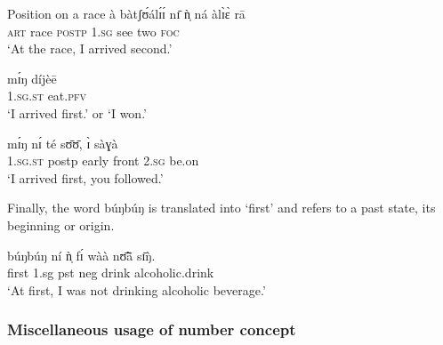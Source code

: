 \begin{exe}
\begin{exe}
\begin{exe}
{\begin{exe}
\begin{exe}
\begin{exe}
\begin{exe}
\begin{exe}
\begin{exe}
\begin{exe}
\begin{exe}
\begin{exe}
\ea\label{ex:race}{\rm Position on a race}
\ea\label{ex:}
\gll à bàtʃʊ́álɪ́ɪ́ nɪ̄ ǹ̩ ná àlɪ̀ɛ̀  rā\\   
 \textsc{art}  {race} \textsc{postp}   \textsc{1.sg}  {see} {two}   \textsc{foc}
\\
 \glt  `At the race, I arrived second.'

\ex\label{ex:}
\gll mɪ́ŋ díjèē\\   
 \textsc{1.sg.st} {eat.\textsc{pfv}}\\
 \glt  `I arrived  first.' or `I won.'

\ex\label{ex:}
\gll mɪ́ŋ nɪ́ té sʊ̄ʊ̄, ɪ̀ sàɣà\\   
 \textsc{1.sg.st} {postp} {early} {front}  \textsc{2.sg} {be.on}\\
 \glt  `I arrived  first, you followed.'
\z
\z



Finally, the word {\sls búŋbúŋ} is translated into `first' and refers to a past 
state, its beginning or origin.

\ea\label{ex:seqevent}
 \gll   búŋbúŋ ní ǹ̩ fɪ́ wàà nʊ̃̄ã̄ sɪ̄ŋ̀.\\
first {\postp}  {\sc 1.sg} {\sc pst} {\sc neg} drink alcoholic.drink\\  
\glt  `At first, I was not drinking alcoholic beverage.'
\z


% 



\subsubsection{Miscellaneous usage of number concept} 
\label{sec:NUM-misc-usage}


\end{exe}
\end{exe}
\end{exe}
\end{exe}
\end{exe}
\end{exe}
\end{exe}
\end{exe}
\end{exe}}
\end{exe}
\end{exe}
\end{exe}
